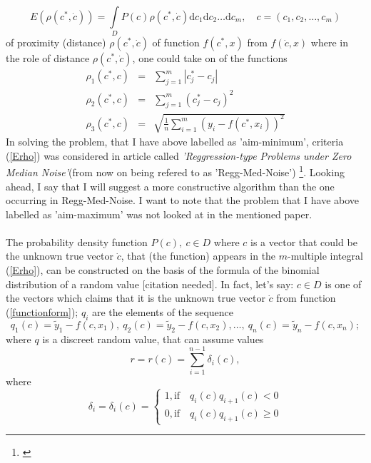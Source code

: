\begin{equation}
E(\rho(c^{*},\dot{c}))= \int\limits_{D}P(c)\rho(c^{*},\dot{c})\mathrm{d}c_{1}\mathrm{d}c_{2}\dots \mathrm{d}c_{m}, \quad c = (c_{1},c_{2},\dots,c_{m}) \label{Erho}
\end{equation}
of proximity (distance) $\rho(c^{*},\dot{c})$ of function $f(c^{*},x)$ from $f(\dot{c},x)$ where in the role of distance $\rho(c^{*},\dot{c})$, one could take on of the functions
\begin{eqnarray}
\rho_{1}(c^{*},c) &=& \sum\limits_{j=1}^{m} \left| c_{j}^{*}-c_{j} \right| \label{rho1}\\
\rho_{2}(c^{*},c) &=& \sum\limits_{j=1}^{m} \left( c_{j}^{*}-c_{j} \right)^{2} \label{rho2}\\
\rho_{3}(c^{*},c) &=& \sqrt{\frac{1}{n}\sum\limits_{i=1}^{m} \left( y_{i}-f(c^{*},x_{i}) \right)^{2}} \label{rho3}
\end{eqnarray}
In solving the problem, that I have above labelled as 'aim-minimum', criteria (\ref{Erho}) was considered in article called \textit{'Reggression-type Problems under Zero Median Noise'}(from now on being refered to as 'Regg-Med-Noise') \footnote{\cite{balk_2010}}. Looking ahead, I say that I will suggest a more constructive algorithm than the one occurring in Regg-Med-Noise. I want to note that the problem that I have above labelled as 'aim-maximum' was not looked at in the mentioned paper. \\
\\
The probability density function $P(c),\  c \in D$ where $c$ is a vector that could be the unknown true vector $\dot{c}$, that (the function) appears in the $m$-multiple integral (\ref{Erho}), can be constructed on the basis of the formula of the binomial distribution of a random value [citation needed]. In fact, let's say: $c \in D$ is one of the vectors which claims that it is the unknown true vector $ \dot{c}$ from function (\ref{functionform}); $q_{i}$ are the elements of the sequence
\begin{equation}
q_{1}(c)=\tilde{y}_{1}-f(c,x_{1}),\ q_{2}(c)=\tilde{y}_{2}-f(c,x_{2}), \dots, \ q_{n}(c)=\tilde{y}_{n}-f(c,x_{n}); \label{sequence}
\end{equation}
where $q$ is a discreet random value, that can assume values
\begin{equation}
r=r(c)=\sum\limits_{i=1}^{n-1} \delta_{i}(c), \label{eq-values-of-q}
\end{equation}
where
\begin{equation}
\delta_{i}=\delta_{i}(c)=
\begin{cases} 
      1, \mathrm{if} \quad q_{i}(c)q_{i+1}(c)<0\\
      0, \mathrm{if} \quad q_{i}(c)q_{i+1}(c)\geq 0
   \end{cases}
\end{equation}
